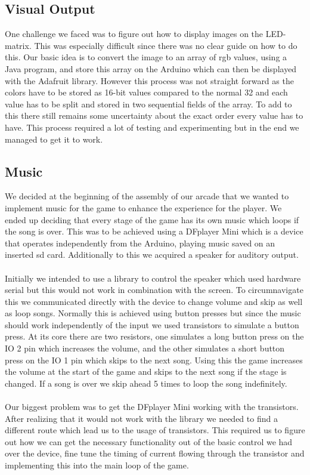 \documentclass[12pt, a4paper]{article}
\begin{document}
\subsection*{Visual Output}
One challenge we faced was to figure out how to display images on the LED-matrix. This was especially difficult since there was no clear guide on how to do this. Our basic idea is to convert the image to an array of rgb values, using a Java program, and store this array on the Arduino which can then be displayed with the Adafruit library. However this process was not straight forward as the colors have to be stored as 16-bit values compared to the normal 32 and each value has to be split and stored in two sequential fields of the array. To add to this there still remains some uncertainty about the exact order every value has to have. This process required a lot of testing and experimenting but in the end we managed to get it to work. 

\subsection*{Music}

We decided at the beginning of the assembly of our arcade that we wanted to implement music for the game to enhance the experience for the player. We ended up deciding that every stage of the game has its own music which loops if the song is over. This was to be achieved using a DFplayer Mini which is a device that operates independently from the Arduino, playing music saved on an inserted sd card. Additionally to this we acquired a speaker for auditory output.\\\\
Initially we intended to use a library to control the speaker which used hardware serial but this would not work in combination with the screen. To circumnavigate this we communicated directly with the device to change volume and skip as well as loop songs. Normally this is achieved using button presses but since the music should work independently of the input we used transistors to simulate a button press. At its core there are two resistors, one simulates a long button press on the IO 2 pin which increases the volume, and the other simulates a short button press on the IO 1 pin which skips to the next song. Using this the game increases the volume at the start of the game and skips to the next song if the stage is changed. If a song is over we skip ahead 5 times to loop the song indefinitely. \\\\
Our biggest problem was to get the DFplayer Mini working with the transistors. After realizing that it would not work with the library we needed to find a different route which lead us to the usage of transistors. This required us to figure out how we can get the necessary functionality out of the basic control we had over the device, fine tune the timing of current flowing through the transistor and implementing this into the main loop of the game.
\end{document}
